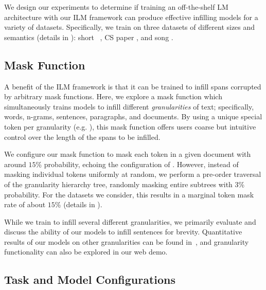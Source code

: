 We design our experiments to determine if training an off-the-shelf LM architecture with our ILM framework can produce effective infilling models for a variety of datasets.
Specifically, we train on three datasets of different sizes and semantics (details in ): short \stories~\citep{mostafazadeh2016corpus}, CS paper \abstracts{}, and song \lyrics{}.

\subsection{Mask Function}\label{sec:mask}

A benefit of the ILM framework is that it can be trained to infill spans corrupted by arbitrary mask functions.
Here, we explore a mask function which simultaneously trains models to infill different \emph{granularities} of text; specifically, words, n-grams, sentences, paragraphs, and documents. 
By using a unique special token per granularity (e.g. \blankword), 
this mask function offers users coarse but intuitive control over the length of the spans to be infilled.

We configure our mask function to mask each token in a given document with around $15$\% probability, echoing the configuration of \citet{devlin2019bert}. 
However, instead of masking individual tokens uniformly at random, 
we perform a pre-order traversal of the granularity hierarchy tree, randomly masking entire subtrees with $3$\% probability. 
For the datasets we consider, this results in a marginal token mask rate of about $15$\% (details in ).

While we train to infill several different granularities, we primarily evaluate and discuss the ability of our models to infill sentences for brevity. 
Quantitative results of our models on other granularities can be found in~, and granularity functionality can also be explored in our web demo.

\subsection{Task and Model Configurations}\label{sec:task_configs}

